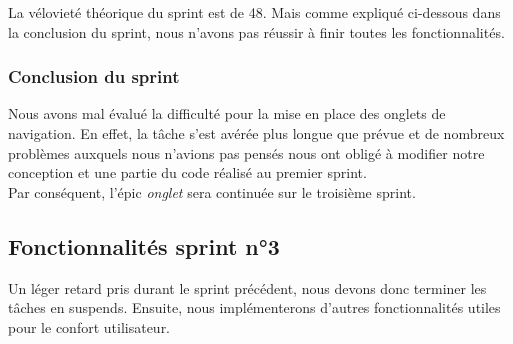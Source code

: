 \documentclass[10pt,a4paper]{article}
\begin{document}
La vélovieté théorique du sprint est de 48. Mais comme expliqué ci-dessous dans la conclusion du sprint, nous n'avons pas réussir à finir toutes les fonctionnalités.

\subsubsection{Conclusion du sprint}
Nous avons mal évalué la difficulté pour la mise en place des onglets de navigation. En effet, la tâche s'est avérée plus longue que prévue et de nombreux problèmes auxquels nous n'avions pas pensés nous ont obligé à modifier notre conception et une partie du code réalisé au premier sprint. \\
Par conséquent, l'épic \textit{onglet} sera continuée sur le troisième sprint.

\newpage

\subsection{Fonctionnalités sprint n°3}
Un léger retard pris durant le sprint précédent, nous devons donc terminer les tâches en suspends. Ensuite, nous implémenterons d'autres fonctionnalités utiles pour le confort utilisateur.
\end{document}
